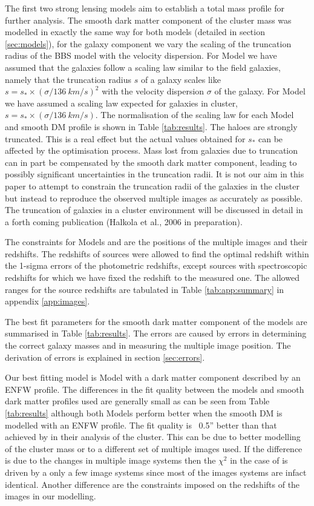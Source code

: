 \documentclass[useAMS,usenatbib]{mn2e}
\newcounter{one}   \setcounter{one}{1}
\newcounter{two}   \setcounter{two}{2}
\begin{document}
The first two strong lensing models aim to establish a total mass
profile for further analysis. The smooth dark matter component of the
cluster mass was modelled in exactly the same way for both models
(detailed in section \ref{sec:models}), for the galaxy component we
vary the scaling of the truncation radius of the BBS model with the
velocity dispersion. For Model  we have assumed that the
galaxies follow a scaling law similar to the field galaxies, namely
that the truncation radius $s$ of a galaxy scales like
$s=s_*\times(\sigma/136~km/s)^2$ with the velocity dispersion $\sigma$
of the galaxy. For Model  we have assumed a scaling law
expected for galaxies in cluster, $s=s_*\times(\sigma/136~km/s)$. The
normalisation of the scaling law for each Model and smooth DM profile
is shown in Table \ref{tab:results}. The haloes are strongly
truncated. This is a real effect but the actual values obtained for
$s_*$ can be affected by the optimisation process. Mass lost from
galaxies due to truncation can in part be compensated by the smooth
dark matter component, leading to possibly significant uncertainties
in the truncation radii. It is not our aim in this paper to attempt to
constrain the truncation radii of the galaxies in the cluster but
instead to reproduce the observed multiple images as accurately as
possible. The truncation of galaxies in a cluster environment will be
discussed in detail in a forth coming publication (Halkola et al.,
2006 in preparation).

The constraints for Models  and  are the
positions of the multiple images and their redshifts. The redshifts of
sources were allowed to find the optimal redshift within the 1-sigma
errors of the photometric redshifts, except sources with spectroscopic
redshifts for which we have fixed the redshift to the measured
one. The allowed ranges for the source redshifts are tabulated in
Table \ref{tab:app:summary} in appendix \ref{app:images}.

The best fit parameters for the smooth dark matter component of the
models are summarised in Table \ref{tab:results}. The errors are
caused by errors in determining the correct galaxy masses and in
measuring the multiple image position. The derivation of errors is
explained in section \ref{sec:errors}.

Our best fitting model is Model  with a dark matter
component described by an ENFW profile. The differences in the fit
quality between the models and smooth dark matter profiles used are
generally small as can be seen from Table \ref{tab:results} although
both Models perform better when the smooth DM is modelled with an ENFW
profile. The fit quality is ~0.5'' better than that achieved by
\citet{broadhurst:05} in their analysis of the cluster. This can be
due to better modelling of the cluster mass or to a different set of
multiple images used. If the difference is due to the changes in
multiple image systems then the $\chi^2$ in the case
\citet{broadhurst:05} of is driven by a only a few image systems since
most of the images systems are infact identical. Another difference
are the constraints imposed on the redshifts of the images in our
modelling.
\end{document}
